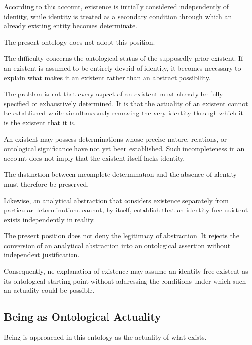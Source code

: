 According to this account, existence is
initially considered independently of
identity, while identity is treated as
a secondary condition through which an
already existing entity becomes determinate.

The present ontology does not adopt this position.

The difficulty concerns the ontological
status of the supposedly prior existent.
If an existent is assumed to be entirely
devoid of identity, it becomes necessary
to explain what makes it an existent
rather than an abstract possibility.

The problem is not that every aspect of
an existent must already be fully specified
or exhaustively determined. It is that
the actuality of an existent cannot be
established while simultaneously removing
the very identity through which it is
the existent that it is.

An existent may possess determinations
whose precise nature, relations, or
ontological significance have not yet
been established. Such incompleteness
in an account does not imply that the
existent itself lacks identity.

The distinction between incomplete
determination and the absence of identity
must therefore be preserved.

Likewise, an analytical abstraction that
considers existence separately from
particular determinations cannot, by
itself, establish that an identity-free
existent exists independently in reality.

The present position does not deny the
legitimacy of abstraction. It rejects
the conversion of an analytical abstraction
into an ontological assertion without
independent justification.

Consequently, no explanation of existence
may assume an identity-free existent as
its ontological starting point without
addressing the conditions under which
such an actuality could be possible.



\subsection{Being as Ontological Actuality}

Being is approached in this ontology
as the actuality of what exists.

